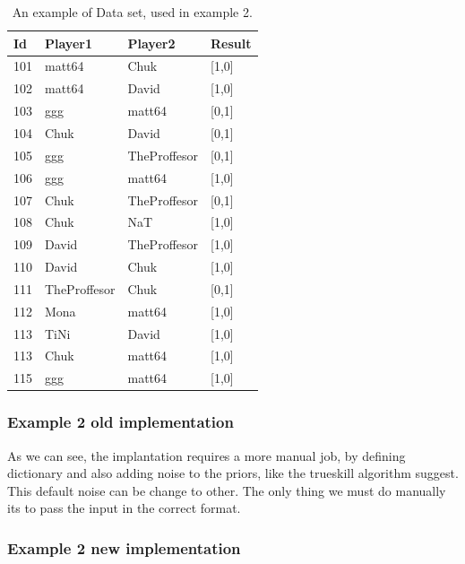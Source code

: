 \documentclass[article]{jss}
\begin{document}
\begin{table}[h!]
	\centering
		\begin{tabular}{llll}
			\hline
			Id  & Player1        & Player2        & Result \\ \hline
			101 & matt64      & Chuk         & [1,0]      \\
			102 & matt64      & David        & [1,0]      \\
			103 & ggg          & matt64       & [0,1]      \\
			104 & Chuk         & David        & [0,1]      \\
			105 & ggg         & TheProffesor & [0,1]      \\
			106 & ggg          & matt64       & [1,0]      \\
			107 & Chuk         & TheProffesor & [0,1]      \\
			108 & Chuk         & NaT          & [1,0]      \\
			109 & David        & TheProffesor & [1,0]      \\
			110 & David        & Chuk         & [1,0]      \\
			111 & TheProffesor & Chuk         & [0,1]      \\
			112 & Mona         & matt64       & [1,0]      \\
			113 & TiNi         & David        & [1,0]      \\
			113 & Chuk         & matt64       & [1,0]      \\
			115 & ggg          & matt64       & [1,0]      \\ \hline
		\end{tabular}%
	\caption{An example of Data set, used in example 2. }
	\label{tab:csvExample2}
\end{table}

\subsubsection{Example 2 old implementation}
As we can see, the implantation requires a more manual job, by defining dictionary and also adding noise to the priors, like the trueskill algorithm suggest. This default noise can be change to other. The only thing we must do manually its to pass the input in the correct format.


\subsubsection{Example 2 new implementation}

\end{document}
